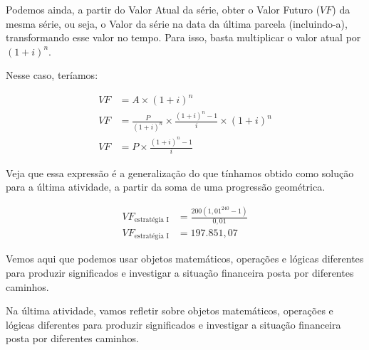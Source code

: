 \begin{reflection}
Podemos ainda, a partir do Valor Atual da série, obter o Valor Futuro ($VF$) da mesma série, ou seja, o Valor da série na data da última parcela (incluindo-a), transformando esse valor no tempo. Para isso, basta multiplicar o valor atual por $(1+i)^n$.

Nesse caso, teríamos:


\begin{align*}
VF&=A\times(1+i)^n\\
VF&=\frac{P}{(1+i)^n}\times\frac{(1+i)^n-1}{i}\times(1+i)^n\\
VF& =P\times\frac{(1+i)^n-1}{i}
\end{align*}



Veja que essa expressão é a generalização do que tínhamos obtido como solução para a última atividade, a partir da soma de uma progressão geométrica.

\begin{align*}
VF_{\text{estratégia I}}&=\frac{200(1{,}01^{240}-1)}{0{,}01}\\
VF_{\text{estratégia I}}&=197.851{,}07
\end{align*}

Vemos aqui que podemos usar objetos matemáticos, operações e lógicas diferentes para produzir significados e investigar a situação financeira posta por diferentes caminhos.

Na última atividade, vamos refletir sobre objetos matemáticos, operações e lógicas diferentes para produzir significados e investigar a situação financeira posta por diferentes caminhos.
\end{reflection}
\clearpage


